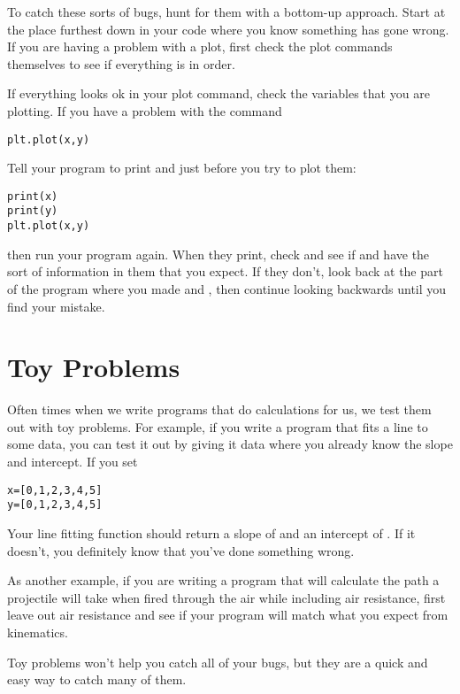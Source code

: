 To catch these sorts of bugs, hunt for them with a bottom-up approach.  Start at the place furthest down in your code where you know something has gone wrong.  If you are having a problem with a plot, first check the plot commands themselves to see if everything is in order.

If everything looks ok in your plot command, check the variables that you are plotting.  If you have a problem with the command
\begin{Verbatim}
plt.plot(x,y)
\end{Verbatim}

Tell your program to print  and  just before you try to plot them:
\begin{Verbatim}
print(x)
print(y)
plt.plot(x,y)

\end{Verbatim}
then run your program again. When they print, check and see if  and  have the sort of information in them that you expect.  If they don't, look back at the part of the program where you made  and , then continue looking backwards until you find your mistake.

\section{Toy Problems}
Often times when we write programs that do calculations for us, we test them out with toy problems.  For example, if you write a program that fits a line to some data, you can test it out by giving it data where you already know the slope and intercept.  If you set
\begin{Verbatim}
x=[0,1,2,3,4,5]
y=[0,1,2,3,4,5]
\end{Verbatim}
Your line fitting function should return a slope of  and an intercept of . If it doesn't, you definitely know that you've done something wrong.

As another example, if you are writing a program that will calculate the path a projectile will take when fired through the air while including air resistance, first leave out air resistance and see if your program will match what you expect from kinematics.

Toy problems won't help you catch all of your bugs, but they are a quick and easy way to catch many of them.

